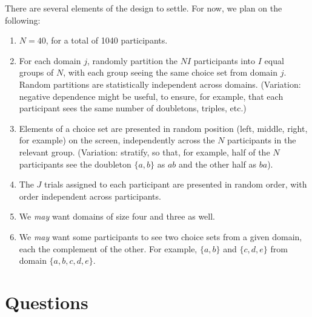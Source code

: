\documentclass[11pt,letter]{amsart}
\begin{document}
There are several elements of the design to settle. For now, we plan on the
following:

\begin{enumerate}
\item $N=40$, for a total of 1040 participants. 

\item For each domain $j$, randomly partition the $NI$ participants into $I$
equal groups of $N$, with each group seeing the same choice set from domain $%
j$.  Random partitions are statistically independent across domains.
(Variation: negative dependence might be useful, to ensure, for example,
that each participant sees the same number of doubletons, triples, etc.) 

\item Elements of a choice set are presented in random position (left,
middle, right, for example) on the screen, independently across the $N$
participants in the relevant group. (Variation: stratify, so that, for
example, half of the $N$ participants see the doubleton $\{a,b\}$ as $ab$
and the other half as $ba$). 

\item The $J$ trials assigned to each participant are presented in random
order, with order independent across participants. 

\item We \emph{may} want domains of size four and three as well. 

\item We \emph{may} want some participants to see two choice sets from a
given domain, each the complement of the other. For example, $\{a,b\}$ and $%
\{c,d,e\}$ from domain $\{a,b,c,d,e\}$.
\end{enumerate}

\section{Questions}
\end{document}
